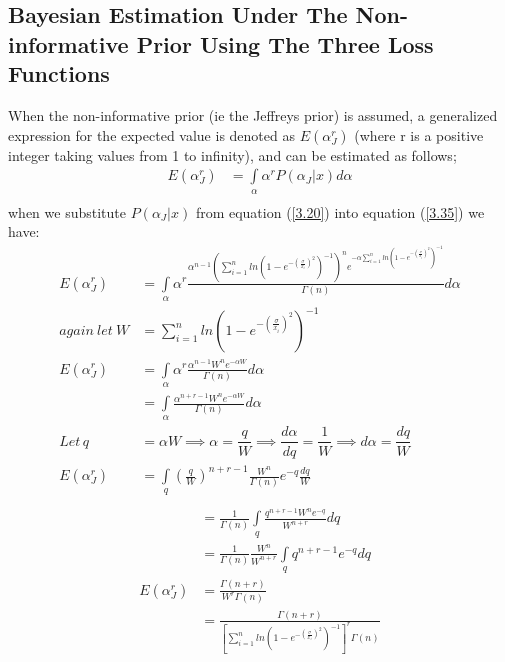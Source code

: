 \documentclass[a4paper,12pt]{report}
\newcommand{\para}{\hspace{0.5cm}}
\begin{document}
\subsection{Bayesian Estimation Under The Non-informative Prior Using The Three Loss Functions}
\noindent\para When the non-informative prior (ie the Jeffreys prior) is assumed, a generalized expression for the expected value is denoted as $E(\alpha_J^r)$ (where r is a positive integer taking values from 1 to infinity), and can be estimated as follows;
\begin{equation}
\begin{split}
E(\alpha_J^r)&=\int\limits_{\alpha}\alpha^r P(\alpha_J|x) d\alpha\\
\end{split}\label{3.28}
\end{equation}
when we substitute $P(\alpha_J|x)$ from equation (\ref{3.20}) into equation (\ref{3.35}) we have:
\[\begin{split}
E(\alpha_J^r)&=\int\limits_{\alpha}\alpha^r \frac{\alpha^{n-1}\left(\sum\limits_{ i=1 }^{n}ln\left(1-e^{-\left(\frac{\sigma}{x_i}\right)^2}\right)^{-1}\right)^n e^{-\alpha\sum\limits_{ i=1 }^{n}ln\left(1-e^{-\left(\frac{\sigma}{x_i}\right)^2}\right)^{-1}}}{\Gamma(n)}d\alpha\\
again\ let\ W&=\sum\limits_{ i=1 }^{n}ln\left(1-e^{-\left(\frac{\sigma}{x_i}\right)^2}\right)^{-1}\\
E(\alpha_J^r)&=\int\limits_{\alpha}\alpha^r \frac{\alpha^{n-1}W^n e^{-\alpha W}}{\Gamma(n)} d\alpha \\
&=\int\limits_{\alpha}\frac{\alpha^{n+r-1}W^n e^{-\alpha W}}{\Gamma(n)} d\alpha \\
Let\,q&=\alpha W\implies\alpha=\dfrac{q}{W}\implies\dfrac{d\alpha}{dq}=\dfrac{1}{W}\implies d\alpha=\dfrac{dq}{W}\\
E(\alpha_J^r)&=\int\limits_{q}\left(\frac{q}{W}\right)^{n+r-1}\frac{W^n}{\Gamma(n)}e^{-q}\frac{dq}{W}\\
\end{split}\]
\begin{equation}\label{3.29}
\begin{split}
&=\frac{1}{\Gamma(n)}\int\limits_{q}\frac{q^{n+r-1}W^ne^{-q}}{W^{n+r}}dq\\
&=\frac{1}{\Gamma(n)}\frac{W^n}{W^{n+r}}\int\limits_{q}q^{n+r-1}e^{-q}dq\\
E(\alpha_J^r)&=\frac{\Gamma(n+r)}{W^r\Gamma(n)}\\
&=\frac{\Gamma(n+r)}{\left[\sum\limits_{ i=1 }^{n}ln\left(1-e^{-\left(\frac{\sigma}{x_i}\right)^2}\right)^{-1}\right]^r\Gamma(n)}
\end{split}
\end{equation}
\end{document}

